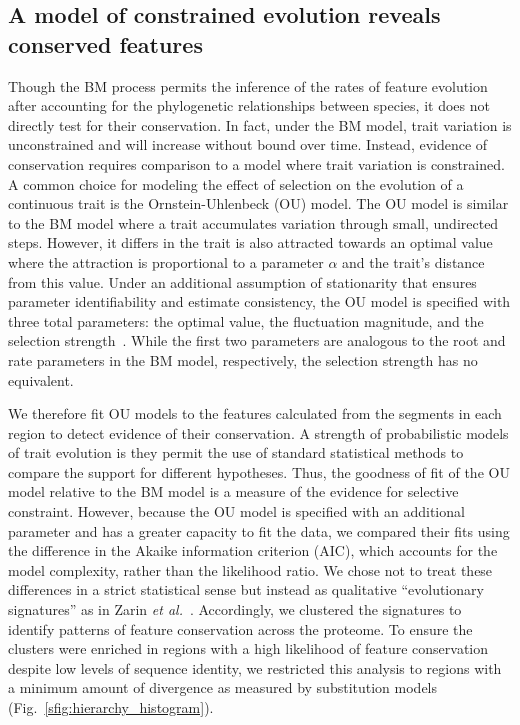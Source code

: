 \subsection{A model of constrained evolution reveals conserved features}
Though the BM process permits the inference of the rates of feature evolution after accounting for the phylogenetic relationships between species, it does not directly test for their conservation. In fact, under the BM model, trait variation is unconstrained and will increase without bound over time. Instead, evidence of conservation requires comparison to a model where trait variation is constrained. A common choice for modeling the effect of selection on the evolution of a continuous trait is the Ornstein-Uhlenbeck (OU) model. The OU model is similar to the BM model where a trait accumulates variation through small, undirected steps. However, it differs in the trait is also attracted towards an optimal value where the attraction is proportional to a parameter $\alpha$ and the trait's distance from this value. Under an additional assumption of stationarity that ensures parameter identifiability and estimate consistency, the OU model is specified with three total parameters: the optimal value, the fluctuation magnitude, and the selection strength~\cite{Ho2013, Ho2014}. While the first two parameters are analogous to the root and rate parameters in the BM model, respectively, the selection strength has no equivalent.

We therefore fit OU models to the features calculated from the segments in each region to detect evidence of their conservation. A strength of probabilistic models of trait evolution is they permit the use of standard statistical methods to compare the support for different hypotheses. Thus, the goodness of fit of the OU model relative to the BM model is a measure of the evidence for selective constraint. However, because the OU model is specified with an additional parameter and has a greater capacity to fit the data, we compared their fits using the difference in the Akaike information criterion (AIC), which accounts for the model complexity, rather than the likelihood ratio. We chose not to treat these differences in a strict statistical sense but instead as qualitative ``evolutionary signatures'' as in Zarin \textit{et al.}~\cite{Zarin2019}. Accordingly, we clustered the signatures to identify patterns of feature conservation across the proteome. To ensure the clusters were enriched in regions with a high likelihood of feature conservation despite low levels of sequence identity, we restricted this analysis to regions with a minimum amount of divergence as measured by substitution models (Fig.~\ref{sfig:hierarchy_histogram}).

